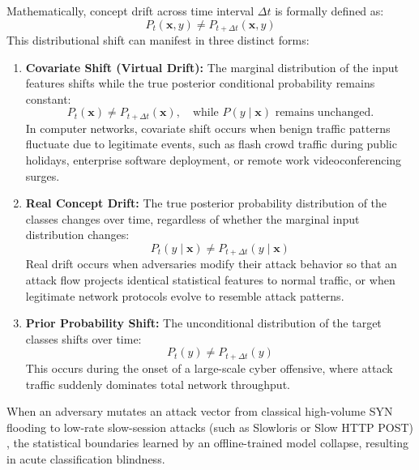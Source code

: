 \documentclass[12pt,a4paper,oneside]{report}
\begin{document}
Mathematically, concept drift across time interval $\Delta t$ is formally defined as:
\begin{equation}
P_t(\mathbf{x}, y) \neq P_{t+\Delta t}(\mathbf{x}, y)
\end{equation}
This distributional shift can manifest in three distinct forms:
\begin{enumerate}
    \item \textbf{Covariate Shift (Virtual Drift):} The marginal distribution of the input features shifts while the true posterior conditional probability remains constant:
    \begin{equation}
    P_t(\mathbf{x}) \neq P_{t+\Delta t}(\mathbf{x}), \quad \text{while } P(y \mid \mathbf{x}) \text{ remains unchanged.}
    \end{equation}
    In computer networks, covariate shift occurs when benign traffic patterns fluctuate due to legitimate events, such as flash crowd traffic during public holidays, enterprise software deployment, or remote work videoconferencing surges.
    
    \item \textbf{Real Concept Drift:} The true posterior probability distribution of the classes changes over time, regardless of whether the marginal input distribution changes:
    \begin{equation}
    P_t(y \mid \mathbf{x}) \neq P_{t+\Delta t}(y \mid \mathbf{x})
    \end{equation}
    Real drift occurs when adversaries modify their attack behavior so that an attack flow projects identical statistical features to normal traffic, or when legitimate network protocols evolve to resemble attack patterns.
    
    \item \textbf{Prior Probability Shift:} The unconditional distribution of the target classes shifts over time:
    \begin{equation}
    P_t(y) \neq P_{t+\Delta t}(y)
    \end{equation}
    This occurs during the onset of a large-scale cyber offensive, where attack traffic suddenly dominates total network throughput.
\end{enumerate}

When an adversary mutates an attack vector from classical high-volume SYN flooding to low-rate slow-session attacks (such as Slowloris or Slow HTTP POST) \cite{cambiaso2013}, the statistical boundaries learned by an offline-trained model collapse, resulting in acute classification blindness.
\end{document}
